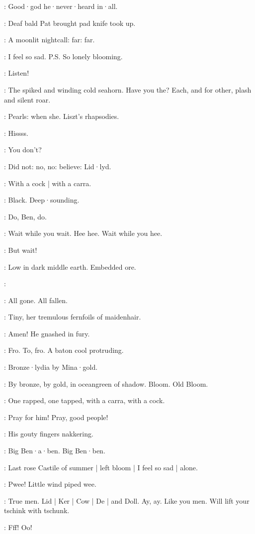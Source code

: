 \goulding:
Good·god he·never·heard in·all.

:
Deaf bald Pat brought pad knife
took up.

\Bloom:
A moonlit nightcall:
far:
far.

\Bloom:
I feel so sad.
P.S. So lonely blooming.

:
Listen!

\Bloom:
The spiked and winding cold seahorn.
Have you the?
Each,
and for other,
plash and silent roar.

\Bloom:
Pearls:
when she.
Liszt's rhapsodies.

:
Hissss.

\Bloom:
You don't?

\Bloom:
Did not:
no, no:
believe:
Lid·lyd.

:
With a cock |
with a carra.

\Bloom:
Black.
Deep·sounding.

\simon:
Do, Ben, do.

\Bloom:
Wait while you wait.
Hee hee.
Wait while you hee.

\Bloom:
But wait!

\Bloom:
Low in dark middle earth.
Embedded ore.

\dollard:

\Bloom:
All gone.
All fallen.

\simon:
Tiny,
her tremulous fernfoils of maidenhair.

:
Amen!
He gnashed in fury.

:
Fro.
To, fro.
A baton cool protruding.

\Bloom:
Bronze·lydia by Mina·gold.

:
By bronze,
by gold,
in oceangreen of shadow.
Bloom.
Old Bloom.

:
One rapped,
one tapped,
with a carra,
with a cock.

\Bloom:
Pray for him!
Pray, good people!

\dollard:
His gouty fingers nakkering.

\simon:
Big Ben·a·ben.
Big Ben·ben.

\Bloom:
Last rose Castile of summer |
left bloom |
I feel so sad |
alone.

\Bloom:
Pwee!
Little wind piped wee.

\Bloom:
True men.
Lid |
Ker |
Cow |
De |
and Doll.
Ay, ay.
Like you men.
Will lift your tschink with tschunk.

:
Fff!
Oo!

